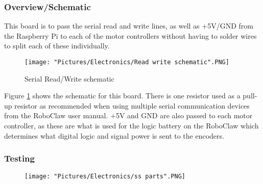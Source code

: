 \documentclass[12pt]{article}
\begin{document}
\subsubsection{Overview/Schematic}

This board is to pass the serial read and write lines, as well as +5V/GND from the Raspberry Pi to each of the motor controllers without having to solder wires to split each of these individually. 

\begin{figure}[H]
  	\centering
    	\texttt{[image: "Pictures/Electronics/Read write schematic".PNG]}
 	\caption{Serial Read/Write schematic}
	\label{rw sch}
\end{figure}

Figure \ref{rw sch} shows the schematic for this board. There is one resistor used as a pull-up resistor as recommended when using multiple serial communication devices from the RoboClaw user manual. +5V and GND are also passed to each motor controller, as these are what is used for the logic battery on the RoboClaw which determines what digital logic and signal power is sent to the encoders. 

\subsubsection{Testing}

\begin{figure}[H]
  	\centering
    	\texttt{[image: "Pictures/Electronics/ss parts".PNG]}
\end{figure}
\end{document}
